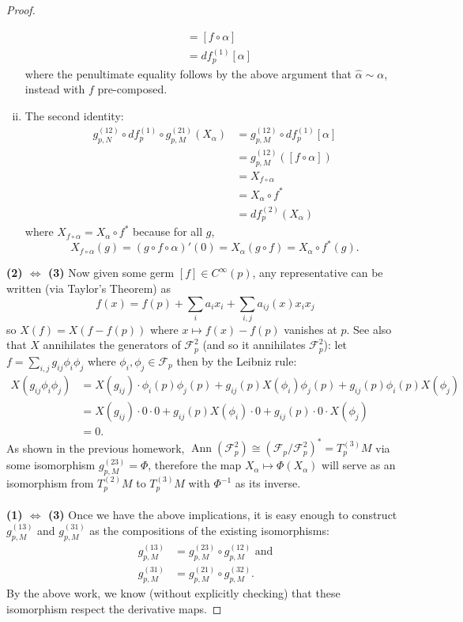 \documentclass{article}
\begin{document}
\begin{proof}
\begin{enumerate}[(i)]
\begin{align*}
        &= [f \circ \alpha] \\
        &= df_p^{(1)}[\alpha]
      \end{align*} where the penultimate equality follows by the above argument
      that $\hat{\alpha} \sim \alpha$, instead with $f$ pre-composed.
    \item The second identity: \begin{align*}
      g_{p,N}^{(12)} \circ df_p^{(1)} \circ g_{p,M}^{(21)}(X_\alpha)
      &= g_{p,M}^{(12)} \circ df_p^{(1)}[\alpha] \\
      &= g_{p,M}^{(12)}([f \circ \alpha]) \\
      &= X_{f \circ \alpha} \\
      &= X_\alpha \circ f^* \\
      &= df_p^{(2)}(X_\alpha)
    \end{align*} where $X_{f\circ\alpha} = X_\alpha \circ f^*$ because for all $g$,
    \[
      X_{f\circ\alpha}(g)
      = (g \circ f \circ \alpha)'(0)
      = X_\alpha(g \circ f)
      = X_\alpha \circ f^*(g).
    \]
  \end{enumerate}
  \textbf{(2) $\Longleftrightarrow$ (3)}
  Now given some germ $[f] \in  C^\infty(p)$, any representative can be written
  (via Taylor's Theorem) as \[
    f(x) = f(p) + \sum_{i} a_ix_i + \sum_{i,j}a_{ij}(x)x_ix_j
  \] so $X(f) = X(f - f(p))$ where $x \mapsto f(x) - f(p)$ vanishes at $p$.
  See also that $X$ annihilates the generators of $\mathcal{F}_p^2$ (and so it annihilates
  $\mathcal{F}_p^2$): let $f = \sum_{i,j}g_{ij}\phi_i\phi_j$ where $\phi_i,\phi_j \in \mathcal{F}_p$
  then by the Leibniz rule: \begin{align*}
    X(g_{ij}\phi_i\phi_j) &= X(g_{ij})\cdot\phi_i(p)\phi_j(p)
      + g_{ij}(p)X(\phi_i)\phi_j(p)
      + g_{ij}(p)\phi_i(p)X(\phi_j) \\
      &= X(g_{ij})\cdot0\cdot0
        + g_{ij}(p)X(\phi_i)\cdot0
        + g_{ij}(p)\cdot0\cdot X(\phi_j) \\
      &= 0.
  \end{align*}
  As shown in the previous homework, $
    \operatorname{Ann}(\mathcal{F}_p^2)
    \cong (\mathcal{F}_p/\mathcal{F}_p^2)^*
    = T_p^{(3)}M
  $ via some isomorphism $g_{p,M}^{(23)} = \Phi$, therefore the map
  $X_\alpha \mapsto \Phi(X_\alpha)$
  will serve as an isomorphism from $T_p^{(2)}M$ to $T_p^{(3)}M$ with
  $\Phi^{-1}$ as its inverse.
  \\~\\
  \textbf{(1) $\Longleftrightarrow$ (3)}
  Once we have the above implications, it is easy enough to construct
  $g_{p,M}^{(13)}$ and $g_{p,M}^{(31)}$ as the compositions of the existing
  isomorphisms: \begin{align*}
    g_{p,M}^{(13)} &= g_{p,M}^{(23)} \circ g_{p,M}^{(12)} \text{ and}\\
    g_{p,M}^{(31)} &= g_{p,M}^{(21)} \circ g_{p,M}^{(32)}.
  \end{align*} By the above work, we know (without explicitly checking) that
  these isomorphism respect the derivative maps.
\end{proof}
\end{document}
